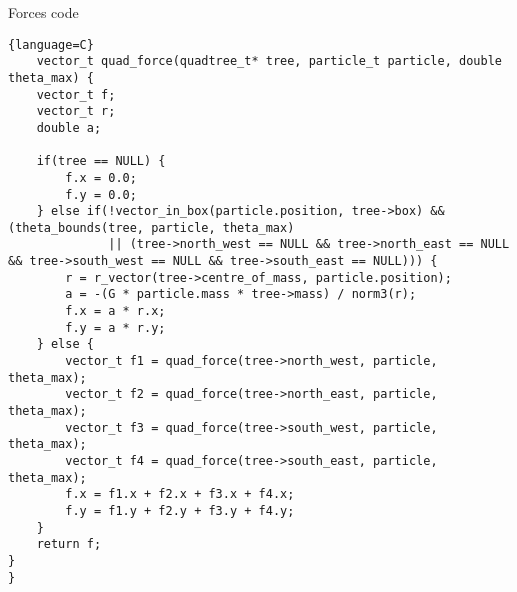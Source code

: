 \documentclass{article}
\begin{document}
\begin{center}
    Forces code
\end{center}
\begin{lstlisting}{language=C}
    vector_t quad_force(quadtree_t* tree, particle_t particle, double theta_max) {
    vector_t f;
    vector_t r;
    double a;

    if(tree == NULL) {
        f.x = 0.0;
        f.y = 0.0;
    } else if(!vector_in_box(particle.position, tree->box) && (theta_bounds(tree, particle, theta_max) 
              || (tree->north_west == NULL && tree->north_east == NULL && tree->south_west == NULL && tree->south_east == NULL))) {
        r = r_vector(tree->centre_of_mass, particle.position);
        a = -(G * particle.mass * tree->mass) / norm3(r);
        f.x = a * r.x;
        f.y = a * r.y;
    } else {
        vector_t f1 = quad_force(tree->north_west, particle, theta_max);
        vector_t f2 = quad_force(tree->north_east, particle, theta_max);
        vector_t f3 = quad_force(tree->south_west, particle, theta_max);
        vector_t f4 = quad_force(tree->south_east, particle, theta_max);
        f.x = f1.x + f2.x + f3.x + f4.x;
        f.y = f1.y + f2.y + f3.y + f4.y;
    }
    return f;
}
}
\end{lstlisting}
\end{document}
